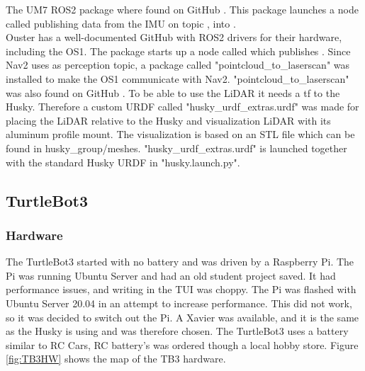 The UM7 ROS2 package where found on GitHub \cite{um7imu}. This package launches a node called  publishing data from the IMU on topic , into .
\\ \newline
Ouster has a well-documented GitHub \cite{ousterros} with ROS2 drivers for their hardware, including the OS1. The package starts up a node called  which publishes . 
Since Nav2 uses  as perception topic, a package called "pointcloud\_to\_laserscan" was installed to make the OS1 communicate with Nav2. "pointcloud\_to\_laserscan" was also found on GitHub \cite{pcl2laser}. 
To be able to use the LiDAR it needs a tf to the Husky. Therefore a custom URDF called "husky\_urdf\_extras.urdf" was made for placing the LiDAR relative to the Husky and visualization LiDAR with its aluminum profile mount. The visualization is based on an STL file which can be found in husky\_group/meshes.
"husky\_urdf\_extras.urdf" is launched together with the standard Husky URDF in "husky.launch.py".  


\subsection{TurtleBot3}
\subsubsection{Hardware}
The TurtleBot3 started with no battery and was driven by a Raspberry Pi. The Pi was running Ubuntu Server and had an old student project saved. It had performance issues, and writing in the TUI was choppy. The Pi was flashed with Ubuntu Server 20.04 in an attempt to increase performance. This did not work, so it was decided to switch out the Pi. A Xavier was available, and it is the same as the Husky is using and was therefore chosen. The TurtleBot3 uses a battery similar to RC Cars, RC battery's was ordered though a local hobby store. Figure \ref{fig:TB3HW} shows the map of the TB3 hardware. 

